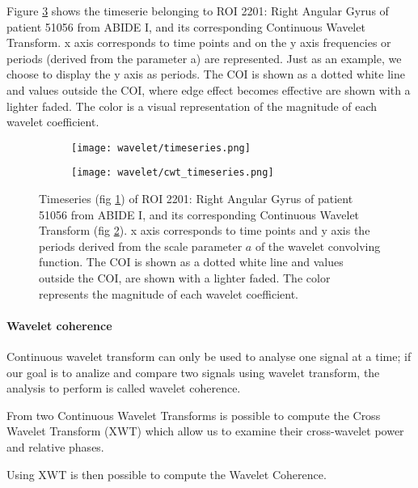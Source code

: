 \documentclass[10pt]{report}
\begin{document}
Figure \ref{fig:cwt_timeseries} shows the timeserie belonging to ROI 2201: Right Angular Gyrus of patient 51056 from ABIDE I, and its corresponding Continuous Wavelet Transform.
x axis corresponds to time points and on the y axis frequencies or periods (derived from the parameter a) are represented. Just as an example, we choose to display the y axis as periods.
The COI is shown as a dotted white line and values outside the COI, where edge effect becomes effective are shown with a lighter faded.
The color is a visual representation of the magnitude of each wavelet coefficient.

\begin{figure}
\begin{subfigure}{0.5\textwidth}
\texttt{[image: wavelet/timeseries.png]}
\caption{}
\label{fig:timeseries_cwt}
\end{subfigure}
\begin{subfigure}{0.5\textwidth}
\texttt{[image: wavelet/cwt\_timeseries.png]}
\caption{}
\label{fig:cwt}
\end{subfigure}
\caption{Timeseries (fig \ref{fig:timeseries_cwt}) of ROI 2201: Right Angular Gyrus of patient 51056 from ABIDE I, and its corresponding Continuous Wavelet Transform  (fig \ref{fig:cwt}).
x axis corresponds to time points and y axis the periods derived from the scale parameter $a$ of the wavelet convolving function.
The COI is shown as a dotted white line and values outside the COI, are shown with a lighter faded.
The color represents the magnitude of each wavelet coefficient.}
\label{fig:cwt_timeseries}
\end{figure}



\paragraph{Wavelet coherence} \hfill \newline

Continuous wavelet transform can only be used to analyse one signal at a time; if our goal is to analize and compare two signals using wavelet transform, the analysis to perform is called wavelet coherence.

From two Continuous Wavelet Transforms is possible to compute the Cross Wavelet Transform (XWT) which allow us to examine their cross-wavelet power and relative phases.

Using XWT is then possible to compute the Wavelet Coherence.
\end{document}
